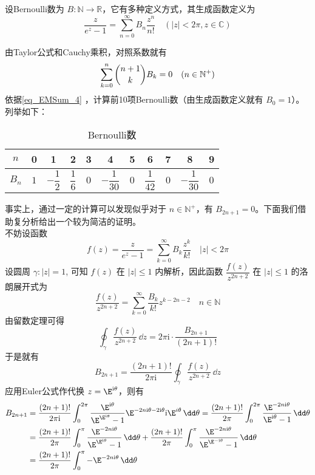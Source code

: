 \begin{definition}{}
设Bernoulli数为 $B:\mathbb{N}\to\mathbb{R} $，它有多种定义方式，其生成函数定义为
\begin{equation}
    \frac{z}{e^{z}-1}=\sum_{n=0}^{\infty}B_{n}\frac{z^{n}}{n!}
    \quad(|z|<2\pi,z\in{\mathbb C})
\end{equation}
\end{definition}
由Taylor公式和Cauchy乘积，对照系数就有
\begin{equation}\label{eq_EMSum_4}
    \sum_{k=0}^{n}\dbinom{n+1}{k}B_{k}=0\quad(n\in{\mathbb N^{+}})
\end{equation}
依据\autoref{eq_EMSum_4} ，计算前10项Bernoulli数（由生成函数定义就有 $B_{0}=1$）。列举如下：
\begin{table}[ht]
\centering
\caption{Bernoulli数}
\begin{tabular}{|c|c|c|c|c|c|c|c|c|c|c|}
\hline
$ n $ & 0 & 1 & 2 & 3 & 4 & 5 & 6 & 7 & 8 & 9\\ 
\hline
$ B_{n} $ & $1$ & $-\dfrac{1}{2}$ & $ \dfrac{1}{6}$ & $0$ & $-\dfrac{1}{30}$ & $0$ & $\dfrac{1}{42}$ & $0$ & $-\dfrac{1}{30}$ & $0$\\
\hline
\end{tabular}
\end{table}
事实上，通过一定的计算可以发现似乎对于 $n\in\mathbb N^+$，有 $B_{2n+1}=0$。下面我们借助复分析给出一个较为简洁的证明。\\
不妨设函数
\[
f(z)=\frac{z}{e^{z}-1}=\sum_{k=0}^{\infty}B_{k}\frac{z^{k}}{k!}\quad|z|<2\pi
\]
设圆周 $\gamma:|z|=1$, 可知 $f(z)$ 在 $|z|\leq 1$ 内解析，因此函数 $\dfrac{f(z)}{z^{2n+2}}$ 在 $|z|\leq 1$ 的洛朗展开式为
\[
\frac{f(z)}{z^{2n+2}}=\sum_{k=0}^{\infty}\frac{B_{k}}{k!}{z^{k-2n-2}}\quad n\in\mathbb N
\]
由留数定理可得
\[
\oint_{\gamma}\frac{f(z)}{z^{2 n+2}}\,\dd z=2\pi\mathrm i\cdot\frac{B_{2 n+1}}{(2n+1)!}
\]
于是就有
\[
B_{2n+1}=\frac{(2n+1)!}{2\pi\mathrm i}\oint_{\gamma}\frac{f(z)}{z^{2 n+2}}\,\dd z
\]
应用Euler公式作代换 $z=\E^{\mathrm i\theta}$，则有
$$
\begin{aligned}
B_{2n+1}&=\frac{(2n+1)!}{2\pi\mathrm i}\int_{0}^{2\pi}\frac{\E^{\mathrm i\theta}}{\E^{\E^{\mathrm i\theta}}-1}\E^{-2n\mathrm i\theta-2\mathrm i\theta}\mathrm i\E^{i \theta}\,\dd\theta
=\frac{(2n+1)!}{2\pi}\int_{0}^{2\pi}\frac{\E^{-2n\mathrm i\theta}}{\E^{\mathrm i\theta}-1}\,\dd\theta\\
&=\frac{(2n+1)!}{2\pi}\int_{0}^{\pi}\frac{\E^{-2n\mathrm i\theta}}{\E^{\E^{\mathrm i\theta}}-1}\,\dd \theta+\frac{(2n+1)!}{2\pi}\int_{0}^{\pi} \frac{\E^{-2n\mathrm i\theta}}{\E^{\E^{-\mathrm i\theta}}-1}\,\dd \theta\\
&=\frac{(2 n+1)!}{2\pi}\int_{0}^{\pi}-\E^{-2n\mathrm i\theta}\,\dd\theta
\end{aligned}
$$
